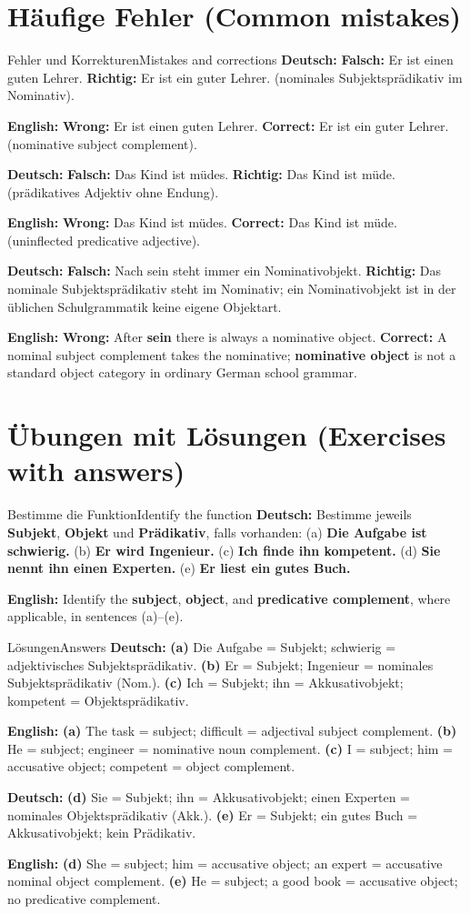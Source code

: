 \documentclass[a4paper,11pt]{article}
\newcommand{\GermanText}[1]{\textbf{Deutsch: }#1\par}
\newcommand{\EnglishText}[1]{{\small\color{SoftGray}\textbf{English: }#1\par}}
\begin{document}
\section{Häufige Fehler \textnormal{(Common mistakes)}}
\begin{grammarentry}{Fehler und Korrekturen}{Mistakes and corrections}
\GermanText{\textbf{Falsch:} Er ist einen guten Lehrer. \textbf{Richtig:} Er ist ein guter Lehrer. (nominales Subjektsprädikativ im Nominativ).}
\EnglishText{\textbf{Wrong:} Er ist einen guten Lehrer. \textbf{Correct:} Er ist ein guter Lehrer. (nominative subject complement).}
\GermanText{\textbf{Falsch:} Das Kind ist müdes. \textbf{Richtig:} Das Kind ist müde. (prädikatives Adjektiv ohne Endung).}
\EnglishText{\textbf{Wrong:} Das Kind ist müdes. \textbf{Correct:} Das Kind ist müde. (uninflected predicative adjective).}
\GermanText{\textbf{Falsch:} Nach \glqq sein\grqq{} steht immer ein Nominativobjekt. \textbf{Richtig:} Das nominale Subjektsprädikativ steht im Nominativ; ein \glqq Nominativobjekt\grqq{} ist in der üblichen Schulgrammatik keine eigene Objektart.}
\EnglishText{\textbf{Wrong:} After \textbf{sein} there is always a nominative object. \textbf{Correct:} A nominal subject complement takes the nominative; \textbf{nominative object} is not a standard object category in ordinary German school grammar.}
\end{grammarentry}

\section{Übungen mit Lösungen \textnormal{(Exercises with answers)}}
\begin{grammarentry}{Bestimme die Funktion}{Identify the function}
\GermanText{Bestimme jeweils \textbf{Subjekt}, \textbf{Objekt} und \textbf{Prädikativ}, falls vorhanden: (a) \textbf{Die Aufgabe ist schwierig.} (b) \textbf{Er wird Ingenieur.} (c) \textbf{Ich finde ihn kompetent.} (d) \textbf{Sie nennt ihn einen Experten.} (e) \textbf{Er liest ein gutes Buch.}}
\EnglishText{Identify the \textbf{subject}, \textbf{object}, and \textbf{predicative complement}, where applicable, in sentences (a)--(e).}
\end{grammarentry}
\begin{grammarentry}{Lösungen}{Answers}
\GermanText{\textbf{(a)} Die Aufgabe = Subjekt; schwierig = adjektivisches Subjektsprädikativ. \textbf{(b)} Er = Subjekt; Ingenieur = nominales Subjektsprädikativ (Nom.). \textbf{(c)} Ich = Subjekt; ihn = Akkusativobjekt; kompetent = Objektsprädikativ.}
\EnglishText{\textbf{(a)} The task = subject; difficult = adjectival subject complement. \textbf{(b)} He = subject; engineer = nominative noun complement. \textbf{(c)} I = subject; him = accusative object; competent = object complement.}
\GermanText{\textbf{(d)} Sie = Subjekt; ihn = Akkusativobjekt; einen Experten = nominales Objektsprädikativ (Akk.). \textbf{(e)} Er = Subjekt; ein gutes Buch = Akkusativobjekt; kein Prädikativ.}
\EnglishText{\textbf{(d)} She = subject; him = accusative object; an expert = accusative nominal object complement. \textbf{(e)} He = subject; a good book = accusative object; no predicative complement.}
\end{grammarentry}
\end{document}
